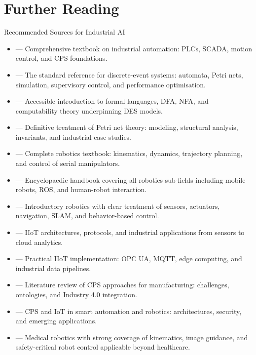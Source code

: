 
\section{Further Reading}

\begin{v3topic}{Recommended Sources for Industrial AI}
    \begin{itemize}
        \item {} --- Comprehensive textbook on industrial automation: PLCs, SCADA, motion control, and CPS foundations.
        \item {} --- The standard reference for discrete-event systems: automata, Petri nets, simulation, supervisory control, and performance optimisation.
        \item {} --- Accessible introduction to formal languages, DFA, NFA, and computability theory underpinning DES models.
        \item {} --- Definitive treatment of Petri net theory: modeling, structural analysis, invariants, and industrial case studies.
        \item {} --- Complete robotics textbook: kinematics, dynamics, trajectory planning, and control of serial manipulators.
        \item {} --- Encyclopaedic handbook covering all robotics sub-fields including mobile robots, ROS, and human-robot interaction.
        \item {} --- Introductory robotics with clear treatment of sensors, actuators, navigation, SLAM, and behavior-based control.
        \item {} --- IIoT architectures, protocols, and industrial applications from sensors to cloud analytics.
        \item {} --- Practical IIoT implementation: OPC UA, MQTT, edge computing, and industrial data pipelines.
        \item {} --- Literature review of CPS approaches for manufacturing: challenges, ontologies, and Industry 4.0 integration.
        \item {} --- CPS and IoT in smart automation and robotics: architectures, security, and emerging applications.
        \item {} --- Medical robotics with strong coverage of kinematics, image guidance, and safety-critical robot control applicable beyond healthcare.
    \end{itemize}
\end{v3topic}

